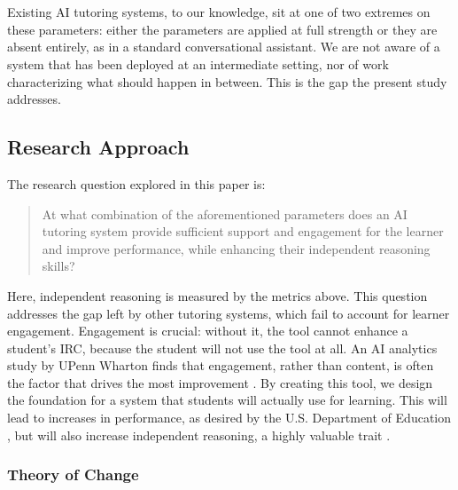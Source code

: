 \documentclass[12pt]{article}
\begin{document}
\\\\
Existing AI tutoring systems, to our knowledge, sit at one of two extremes on these parameters: either the parameters are applied at full strength or they are absent entirely, as in a standard conversational assistant. We are not aware of a system that has been deployed at an intermediate setting, nor of work characterizing what should happen in between. This is the gap the present study addresses.
\subsection{Research Approach}

The research question explored in this paper is:

\begin{quote}
    At what combination of the aforementioned parameters does an AI tutoring system provide sufficient support and engagement for the learner and improve performance, while enhancing their independent reasoning skills?
\end{quote}

\noindent Here, independent reasoning is measured by the metrics above. This question addresses the gap left by other tutoring systems, which fail to account for learner engagement. Engagement is crucial: without it, the tool cannot enhance a student's IRC, because the student will not use the tool at all. An AI analytics study by UPenn Wharton finds that engagement, rather than content, is often the factor that drives the most improvement \cite{wharton}. By creating this tool, we design the foundation for a system that students will actually use for learning. This will lead to increases in performance, as desired by the U.S. Department of Education \cite{usdoe2015essa}, but will also increase independent reasoning, a highly valuable trait \cite{wef2025futureofjobs}.

\subsubsection{Theory of Change}
\end{document}
